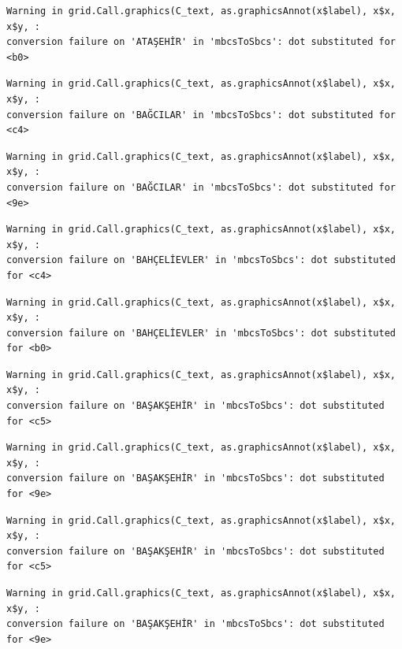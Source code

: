 \documentclass[
  11pt,
  a4paper,
  DIV=11,
  numbers=noendperiod]{scrartcl}
\begin{document}
\begin{verbatim}
Warning in grid.Call.graphics(C_text, as.graphicsAnnot(x$label), x$x, x$y, :
conversion failure on 'ATAŞEHİR' in 'mbcsToSbcs': dot substituted for <b0>
\end{verbatim}

\begin{verbatim}
Warning in grid.Call.graphics(C_text, as.graphicsAnnot(x$label), x$x, x$y, :
conversion failure on 'BAĞCILAR' in 'mbcsToSbcs': dot substituted for <c4>
\end{verbatim}

\begin{verbatim}
Warning in grid.Call.graphics(C_text, as.graphicsAnnot(x$label), x$x, x$y, :
conversion failure on 'BAĞCILAR' in 'mbcsToSbcs': dot substituted for <9e>
\end{verbatim}

\begin{verbatim}
Warning in grid.Call.graphics(C_text, as.graphicsAnnot(x$label), x$x, x$y, :
conversion failure on 'BAHÇELİEVLER' in 'mbcsToSbcs': dot substituted for <c4>
\end{verbatim}

\begin{verbatim}
Warning in grid.Call.graphics(C_text, as.graphicsAnnot(x$label), x$x, x$y, :
conversion failure on 'BAHÇELİEVLER' in 'mbcsToSbcs': dot substituted for <b0>
\end{verbatim}

\begin{verbatim}
Warning in grid.Call.graphics(C_text, as.graphicsAnnot(x$label), x$x, x$y, :
conversion failure on 'BAŞAKŞEHİR' in 'mbcsToSbcs': dot substituted for <c5>
\end{verbatim}

\begin{verbatim}
Warning in grid.Call.graphics(C_text, as.graphicsAnnot(x$label), x$x, x$y, :
conversion failure on 'BAŞAKŞEHİR' in 'mbcsToSbcs': dot substituted for <9e>
\end{verbatim}

\begin{verbatim}
Warning in grid.Call.graphics(C_text, as.graphicsAnnot(x$label), x$x, x$y, :
conversion failure on 'BAŞAKŞEHİR' in 'mbcsToSbcs': dot substituted for <c5>
\end{verbatim}

\begin{verbatim}
Warning in grid.Call.graphics(C_text, as.graphicsAnnot(x$label), x$x, x$y, :
conversion failure on 'BAŞAKŞEHİR' in 'mbcsToSbcs': dot substituted for <9e>
\end{verbatim}
\end{document}
